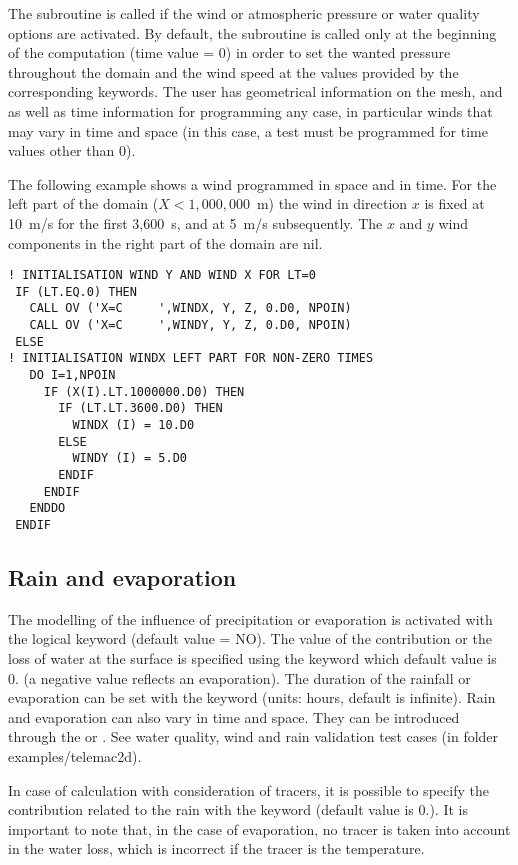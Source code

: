 The  subroutine is called if the wind or atmospheric pressure
or water quality options are activated.
By default, the subroutine is called only at the beginning of the computation
(time value = 0) in order to set the wanted pressure throughout the domain
and the wind speed at the values provided by the corresponding keywords.
The user has geometrical information on the mesh, and as well as time
information for programming any case, in particular winds that may vary in time
and space (in this case, a test must be programmed for time values other than 0).

The following example shows a wind programmed in space and in time.
For the left part of the domain ($ X < 1,000,000$~m) the wind in direction $x$
is fixed at 10~m/s for the first 3,600~s, and at 5~m/s subsequently.
The $x$ and $y$ wind components in the right part of the domain are nil.

\begin{lstlisting}[language=TelFortran]
! INITIALISATION WIND Y AND WIND X FOR LT=0
 IF (LT.EQ.0) THEN
   CALL OV ('X=C     ',WINDX, Y, Z, 0.D0, NPOIN)
   CALL OV ('X=C     ',WINDY, Y, Z, 0.D0, NPOIN)
 ELSE
! INITIALISATION WINDX LEFT PART FOR NON-ZERO TIMES
   DO I=1,NPOIN
     IF (X(I).LT.1000000.D0) THEN
       IF (LT.LT.3600.D0) THEN
         WINDX (I) = 10.D0
       ELSE
         WINDY (I) = 5.D0
       ENDIF
     ENDIF
   ENDDO
 ENDIF
\end{lstlisting}

\subsection{Rain and evaporation}

The modelling of the influence of precipitation or evaporation is activated
with the logical keyword  (default value = NO).
The value of the contribution or the loss of water at the surface is specified
using the keyword  which default value
is 0. (a negative value reflects an evaporation).
The duration of the rainfall or evaporation can be set with the keyword
 (units: hours, default is
infinite).
Rain and evaporation can also vary in time and space.
They can be introduced through the 
or .
See water quality, wind and rain validation test cases (in folder
examples/telemac2d).

In case of calculation with consideration of tracers, it is possible to specify
the contribution related to the rain with the keyword
 (default value is 0.).
It is important to note that, in the case of evaporation, no tracer is taken
into account in the water loss, which is incorrect if the tracer is the
temperature.

